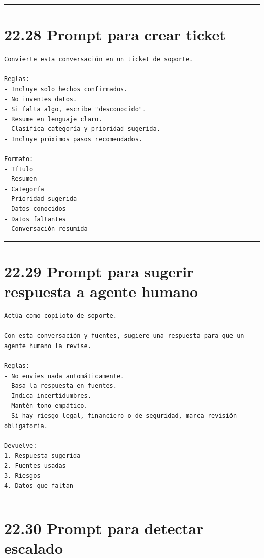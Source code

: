 \begin{center}\rule{0.5\linewidth}{0.5pt}\end{center}

\section{22.28 Prompt para crear ticket}\label{prompt-para-crear-ticket}

\begin{lstlisting}
Convierte esta conversación en un ticket de soporte.

Reglas:
- Incluye solo hechos confirmados.
- No inventes datos.
- Si falta algo, escribe "desconocido".
- Resume en lenguaje claro.
- Clasifica categoría y prioridad sugerida.
- Incluye próximos pasos recomendados.

Formato:
- Título
- Resumen
- Categoría
- Prioridad sugerida
- Datos conocidos
- Datos faltantes
- Conversación resumida
\end{lstlisting}

\begin{center}\rule{0.5\linewidth}{0.5pt}\end{center}

\section{22.29 Prompt para sugerir respuesta a agente
humano}\label{prompt-para-sugerir-respuesta-a-agente-humano}

\begin{lstlisting}
Actúa como copiloto de soporte.

Con esta conversación y fuentes, sugiere una respuesta para que un agente humano la revise.

Reglas:
- No envíes nada automáticamente.
- Basa la respuesta en fuentes.
- Indica incertidumbres.
- Mantén tono empático.
- Si hay riesgo legal, financiero o de seguridad, marca revisión obligatoria.

Devuelve:
1. Respuesta sugerida
2. Fuentes usadas
3. Riesgos
4. Datos que faltan
\end{lstlisting}

\begin{center}\rule{0.5\linewidth}{0.5pt}\end{center}

\section{22.30 Prompt para detectar
escalado}\label{prompt-para-detectar-escalado}

